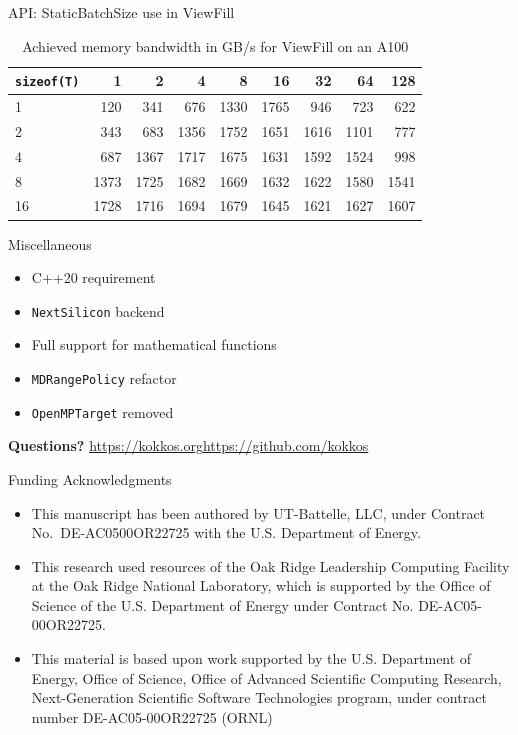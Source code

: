 \begin{frame}[fragile]{API: StaticBatchSize use in ViewFill}
\begin{table}
\centering
\begin{tabular}{|l|r|r|r|r|r|r|r|r|}
\hline
\texttt{sizeof(T)} & 1  &  2 &  4 &  8 & 16 & 32 & 64 & 128 \\ 
\hline
 1 & 120 & 341 & 676 & 1330 & 1765 & 946 & 723 & 622 \\
\hline
 2 & 343 & 683 & 1356 & 1752 & 1651 & 1616 & 1101 & 777 \\
\hline
 4 & 687 & 1367 & 1717 & 1675 & 1631 & 1592 & 1524 & 998 \\
\hline
 8 & 1373 & 1725 & 1682 & 1669 & 1632 & 1622 & 1580 & 1541 \\
\hline
 16 & 1728 & 1716 & 1694 & 1679 & 1645 & 1621 & 1627 & 1607 \\
\hline
\end{tabular}
\caption{Achieved memory bandwidth in GB/s for ViewFill on an A100}
\end{table}
\end{frame}

\begin{frame}{Miscellaneous}
\begin{itemize}
\item C++20 requirement
\item \texttt{NextSilicon} backend
\item Full support for mathematical functions
\item \texttt{MDRangePolicy} refactor
\item \texttt{OpenMPTarget} removed
\end{itemize}
\end{frame}

\begin{frame}
  \vfill
  \centering
  \textbf{\huge{Questions?}}
  \vfill
  \url{https://kokkos.org}\qquad \url{https://github.com/kokkos}
  \end{frame}


\begin{frame}{Funding Acknowledgments}
\small

\vspace{-\topsep}\begin{itemize}
  \item This manuscript has been authored by UT-Battelle, LLC, under Contract
 No.~DE-AC0500OR22725 with the U.S. Department of Energy.
\item This research used resources of the Oak Ridge Leadership Computing Facility at the Oak Ridge National
Laboratory, which is supported by the Office of Science of the U.S. Department of Energy under Contract No. DE-AC05-00OR22725.
\item This material is based upon work supported by the U.S. Department of Energy, Office of Science, Office of Advanced Scientific Computing Research,
Next-Generation Scientific Software Technologies program, under contract number DE-AC05-00OR22725 (ORNL)
\end{itemize}
\end{frame}

